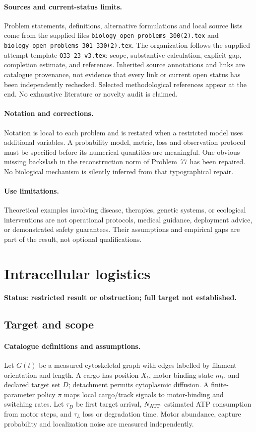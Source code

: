 \documentclass[11pt]{article}
\begin{document}
\paragraph{Sources and current-status limits.}
Problem statements, definitions, alternative formulations and local source lists
come from the supplied files
\texttt{biology\_open\_problems\_300(2).tex} and
\texttt{biology\_open\_problems\_301\_330(2).tex}.
The organization follows the supplied attempt template
\texttt{O33-23\_v3.tex}: scope, substantive calculation, explicit gap,
completion estimate, and references. Inherited source annotations and links are
catalogue provenance, not evidence that every link or current open status has
been independently rechecked. Selected methodological references appear at the
end. No exhaustive literature or novelty audit is claimed.

\paragraph{Notation and corrections.}
Notation is local to each problem and is restated when a restricted model uses
additional variables. A probability model, metric, loss and observation protocol
must be specified before its numerical quantities are meaningful. One obvious
missing backslash in the reconstruction norm of Problem~77 has been repaired.
No biological mechanism is silently inferred from that typographical repair.

\paragraph{Use limitations.}
Theoretical examples involving disease, therapies, genetic systems, or ecological
interventions are not operational protocols, medical guidance, deployment advice,
or demonstrated safety guarantees. Their assumptions and empirical gaps are part
of the result, not optional qualifications.


\section*{Intracellular logistics}
\label{prob:016}
\noindent\textbf{Status: restricted result or obstruction; full target not established.}
\subsection{Target and scope}
\paragraph{Catalogue definitions and assumptions.}
Let $G(t)$ be a measured cytoskeletal graph with edges labelled by filament orientation and length. A cargo has position $X_t$, motor-binding state $m_t$, and declared target set $D$; detachment permits cytoplasmic diffusion. A finite-parameter policy $\pi$ maps local cargo/track signals to motor-binding and switching rates. Let $\tau_D$ be first target arrival, $N_{\rm ATP}$ estimated ATP consumption from motor steps, and $\tau_L$ loss or degradation time. Motor abundance, capture probability and localization noise are measured independently.
\end{document}
